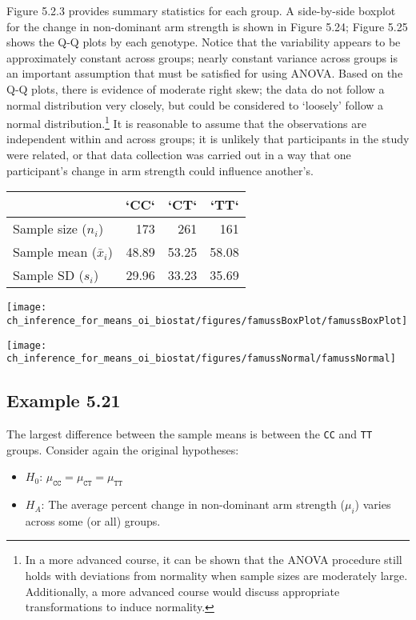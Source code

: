 \documentclass[
  letterpaper,
  DIV=11,
  numbers=noendperiod]{scrreprt}
\providecommand{\tightlist}{%
  \setlength{\itemsep}{0pt}\setlength{\parskip}{0pt}}\usepackage{longtable,booktabs,array}
\begin{document}
Figure 5.2.3 provides summary statistics for each group. A side-by-side
boxplot for the change in non-dominant arm strength is shown in Figure
5.24; Figure 5.25 shows the Q-Q plots by each genotype. Notice that the
variability appears to be approximately constant across groups; nearly
constant variance across groups is an important assumption that must be
satisfied for using ANOVA. Based on the Q-Q plots, there is evidence of
moderate right skew; the data do not follow a normal distribution very
closely, but could be considered to `loosely' follow a normal
distribution.\footnote{In a more advanced course, it can be shown that
  the ANOVA procedure still holds with deviations from normality when
  sample sizes are moderately large. Additionally, a more advanced
  course would discuss appropriate transformations to induce normality.}
It is reasonable to assume that the observations are independent within
and across groups; it is unlikely that participants in the study were
related, or that data collection was carried out in a way that one
participant's change in arm strength could influence another's.

\begin{tabular}{lrrr}
    \hline
    & `CC` & `CT` & `TT` \\
    \hline
    Sample size ($n_i$) & 173 & 261 & 161 \\
    Sample mean ($\bar{x}_i$)   & 48.89 & 53.25 & 58.08 \\
    Sample SD ($s_i$)   & 29.96 & 33.23 & 35.69 \\
    \hline
\end{tabular}

\texttt{[image: ch\_inference\_for\_means\_oi\_biostat/figures/famussBoxPlot/famussBoxPlot]}

\texttt{[image: ch\_inference\_for\_means\_oi\_biostat/figures/famussNormal/famussNormal]}

\hypertarget{example-5.21}{%
\subsection{Example 5.21}\label{example-5.21}}

The largest difference between the sample means is between the
\texttt{CC} and \texttt{TT} groups. Consider again the original
hypotheses:

\begin{itemize}
\tightlist
\item
  \(H_0\): \(\mu_{\texttt{CC}} = \mu_{\texttt{CT}} = \mu_{\texttt{TT}}\)
\item
  \(H_A\): The average percent change in non-dominant arm strength
  (\(\mu_i\)) varies across some (or all) groups.
\end{itemize}
\end{document}
